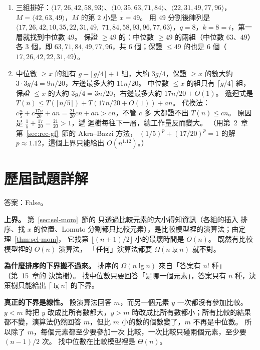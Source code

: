 \begin{enumerate}
\item 三組排好：$\langle 17, 26, 42, 58, 93 \rangle$、$\langle 10, 35, 63, 71, 84
\rangle$、$\langle 22, 31, 49, 77, 96 \rangle$，$M = \langle 42, 63, 49 \rangle$，$M$
的第 $2$ 小是 $x = 49$。 用 $49$ 分割後陣列是 $\langle 17, 26, 42, 10, 35, 22, 31, 49,$
$71, 84, 58, 93, 96, 77, 63 \rangle$，$q = 8$，$k = 8 = i$，第一層就找到中位數 $49$。
保證 $\ge 49$ 的：中位數 $\ge 49$ 的兩組（中位數 $63$、$49$）各 $3$ 個，即
$63, 71, 84, 49, 77, 96$，共 $6$ 個；保證 $\le 49$ 的也是 $6$ 個（$17, 26, 42, 22, 31,
49$）。

\item 中位數 $\ge x$ 的組有 $g - \lceil g/4 \rceil + 1$ 組，大約 $3g/4$，保證 $\ge x$
的數大約 $3 \cdot 3g/4 = 9n/20$，左邊最多大約 $11n/20$。 中位數 $\le x$ 的組只有
$\lceil g/4 \rceil$ 組，保證 $\le x$ 的大約 $3g/4 = 3n/20$，右邊最多大約
$17n/20 + O(1)$。 遞迴式是 $T(n) \le T(\lceil n/5 \rceil) + T(17n/20 + O(1)) + an$。
代換法：$c\frac{n}{5} + c\frac{17n}{20} + an = \frac{21}{20}cn + an > cn$，不管 $c$ 多
大都證不出 $T(n) \le cn$。 原因是 $\frac{1}{5} + \frac{17}{20} = \frac{21}{20} > 1$，遞
迴樹每往下一層，總工作量反而變大。 （用第~2~章第~\ref{sec:rec-gf}~節的 Akra--Bazzi 方法，
$(1/5)^p + (17/20)^p = 1$ 的解 $p \approx 1.12$，這個上界只能給出
$O(n^{1.12})$。）

\end{enumerate}

\section*{歷屆試題詳解}

答案：False。

\textbf{上界。} 第~\ref{sec:sel-mom}~節的  只透過比較元素的大小得知資訊（各組的插入
排序、找 $x$ 的位置、Lomuto 分割都只比較元素），是比較模型裡的演算法；由定理~\ref{thm:sel-mom}，
它找第 $\lfloor (n+1)/2 \rfloor$ 小的最壞時間是 $O(n)$。 既然有比較模型裡的 $O(n)$ 演算法，
「任何」演算法都要 $\Omega(n \lg n)$ 就不對。

\textbf{為什麼排序的下界搬不過來。} 排序的 $\Omega(n \lg n)$ 來自「答案有 $n!$ 種」（第~15~章的
決策樹）。 找中位數只要回答「是哪一個元素」，答案只有 $n$ 種，決策樹只能給出 $\lceil \lg n
\rceil$ 的下界。

\textbf{真正的下界是線性。} 設演算法回答 $m$，而另一個元素 $y$ 一次都沒有參加比較。 $y < m$
時把 $y$ 改成比所有數都大，$y > m$ 時改成比所有數都小；所有比較的結果都不變，演算法仍然回答
$m$，但比 $m$ 小的數的個數變了，$m$ 不再是中位數。 所以除了 $m$，每個元素都至少要參加一次
比較，一次比較只碰兩個元素，至少要 $(n-1)/2$ 次。 找中位數在比較模型裡是 $\Theta(n)$。

